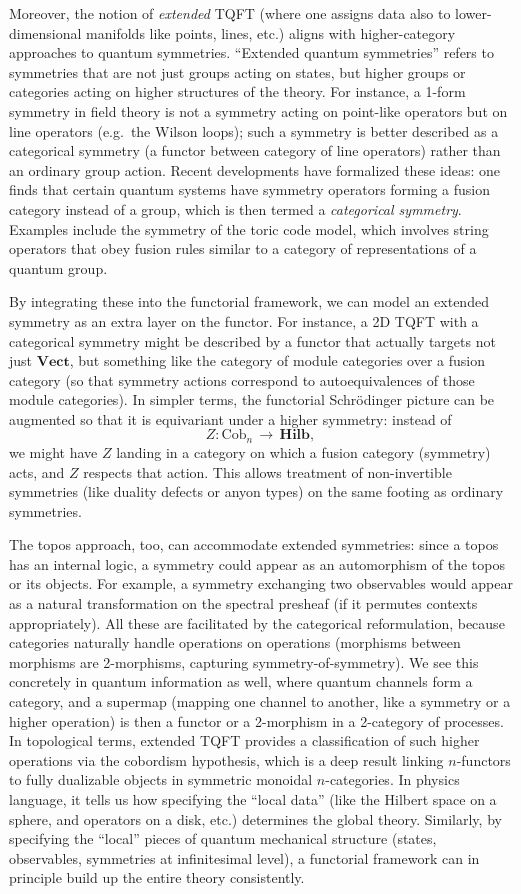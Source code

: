 \documentclass[12pt]{article}
\begin{document}
Moreover, the notion of \emph{extended} TQFT (where one assigns data also to lower-dimensional manifolds like points, lines, etc.) aligns with higher-category approaches to quantum symmetries. ``Extended quantum symmetries'' refers to symmetries that are not just groups acting on states, but higher groups or categories acting on higher structures of the theory. For instance, a 1-form symmetry in field theory is not a symmetry acting on point-like operators but on line operators (e.g.\ the Wilson loops); such a symmetry is better described as a categorical symmetry (a functor between category of line operators) rather than an ordinary group action. Recent developments have formalized these ideas: one finds that certain quantum systems have symmetry operators forming a fusion category instead of a group, which is then termed a \emph{categorical symmetry}. Examples include the symmetry of the toric code model, which involves string operators that obey fusion rules similar to a category of representations of a quantum group.

By integrating these into the functorial framework, we can model an extended symmetry as an extra layer on the functor. For instance, a 2D TQFT with a categorical symmetry might be described by a functor that actually targets not just $\mathbf{Vect}$, but something like the category of module categories over a fusion category (so that symmetry actions correspond to autoequivalences of those module categories). In simpler terms, the functorial Schrödinger picture can be augmented so that it is equivariant under a higher symmetry: instead of 
\[
   Z: \mathrm{Cob}_n \,\to\, \mathbf{Hilb},
\]
we might have $Z$ landing in a category on which a fusion category (symmetry) acts, and $Z$ respects that action. This allows treatment of non-invertible symmetries (like duality defects or anyon types) on the same footing as ordinary symmetries.

The topos approach, too, can accommodate extended symmetries: since a topos has an internal logic, a symmetry could appear as an automorphism of the topos or its objects. For example, a symmetry exchanging two observables would appear as a natural transformation on the spectral presheaf (if it permutes contexts appropriately). All these are facilitated by the categorical reformulation, because categories naturally handle operations on operations (morphisms between morphisms are 2-morphisms, capturing symmetry-of-symmetry). We see this concretely in quantum information as well, where quantum channels form a category, and a supermap (mapping one channel to another, like a symmetry or a higher operation) is then a functor or a 2-morphism in a 2-category of processes. In topological terms, extended TQFT provides a classification of such higher operations via the cobordism hypothesis, which is a deep result linking $n$-functors to fully dualizable objects in symmetric monoidal $n$-categories. In physics language, it tells us how specifying the ``local data'' (like the Hilbert space on a sphere, and operators on a disk, etc.) determines the global theory. Similarly, by specifying the ``local'' pieces of quantum mechanical structure (states, observables, symmetries at infinitesimal level), a functorial framework can in principle build up the entire theory consistently.
\end{document}
